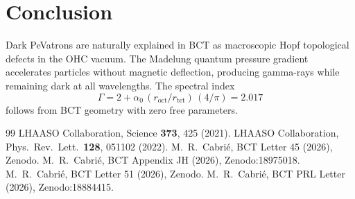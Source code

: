 \documentclass[twocolumn,prl,showpacs,preprintnumbers,amsmath,amssymb]{revtex4-1}
\begin{document}
\section{Conclusion}

Dark PeVatrons are naturally explained in BCT as macroscopic Hopf
topological defects in the OHC vacuum. The Madelung quantum pressure
gradient accelerates particles without magnetic deflection, producing
gamma-rays while remaining dark at all wavelengths. The spectral index
\begin{equation}
\Gamma = 2 + \alpha_0\,(r_\mathrm{oct}/r_\mathrm{tet})\,(4/\pi)
= \mathbf{2.017}
\end{equation}
follows from BCT geometry with zero free parameters.

\begin{thebibliography}{99}
 LHAASO Collaboration, Science \textbf{373}, 425 (2021).
 LHAASO Collaboration, Phys.\ Rev.\ Lett.\ \textbf{128}, 051102 (2022).
 M.~R.~Cabri\'e, BCT Letter 45 (2026), Zenodo.
  M.~R.~Cabri\'e, BCT Appendix JH (2026), Zenodo:18975018.
 M.~R.~Cabri\'e, BCT Letter 51 (2026), Zenodo.
 M.~R.~Cabri\'e, BCT PRL Letter (2026), Zenodo:18884415.
\end{thebibliography}
\end{document}
